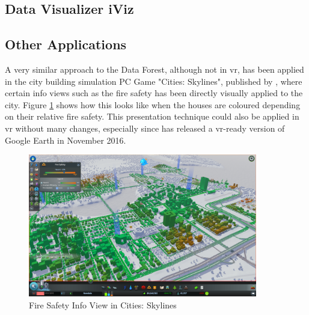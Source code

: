 
\subsection{Data Visualizer iViz}



\subsection{Other Applications}

A very similar approach to the Data Forest, although not in \gls{vr}, has been applied in the city building simulation PC Game "Cities: Skylines", published by \cite{Paradox2014}, where certain info views such as the fire safety has been directly visually applied to the city. Figure \ref{fig:citiesskylinesfiresafety} shows how this looks like when the houses are coloured depending on their relative fire safety. This presentation technique could also be applied in \gls{vr} without many changes, especially since \cite{Google2016a} has released a \gls{vr}-ready version of Google Earth in November 2016.
\begin{figure}[b]
	\begin{center}
		\includegraphics[width=10cm]{03_Figures/05_LitReview/ParadoxWiki2014_CitiesSkylines.png}
		\caption[Fire Safety Info View in Cities: Skylines]{Fire Safety Info View in Cities: Skylines \citep{Paradox2014}}
		\label{fig:citiesskylinesfiresafety}
	\end{center}
\end{figure}





